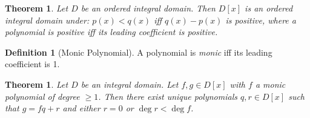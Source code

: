\documentclass{article}
\newtheorem{theorem}[axiom]{Theorem}
\theoremstyle{definition}
\newtheorem{definition}[axiom]{Definition}
\begin{document}
    \begin{theorem}
        Let $D$ be an ordered integral domain. Then $D[x]$ is an ordered integral domain under:
        $p(x) < q(x)$ iff $q(x) - p(x)$ is positive, where a polynomial is positive iff its leading
        coefficient is positive.
    \end{theorem}
    
    \begin{definition}[Monic Polynomial]
        A polynomial is \emph{monic} iff its leading coefficient is 1.
    \end{definition}

    \begin{theorem}
        Let $D$ be an integral domain. Let $f, g \in D[x]$ with $f$ a monic polynomial of degree $\geq 1$.
        Then there exist unique polynomials $q, r \in D[x]$ such that $g = fq + r$ and either $r = 0$
        or $\deg r < \deg f$.
    \end{theorem}
\end{document}

